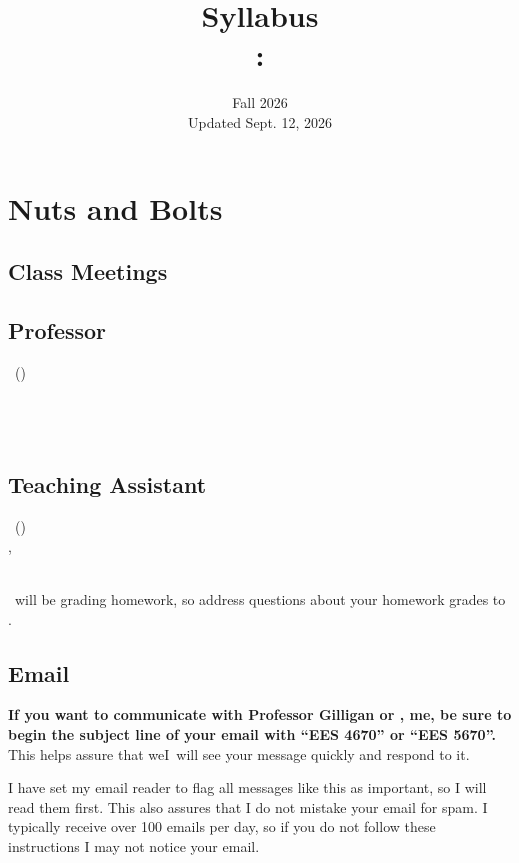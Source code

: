 \documentclass[11pt,twoside]{jgsyllabus}\usepackage[]{graphicx}\usepackage[]{xcolor}
\title{Syllabus\\
\ShortCourseNumber: \LongCourseName}
\date{Fall 2026\\ Updated Sept. 12, 2026}
\begin{document}
\maketitle

\section[Nuts \& Bolts]{Nuts and Bolts}
\label{sec:NutsAndBolts}
\subsection{Class Meetings}
\ClassMeetings
\subsection{Professor}
\label{sec:Professor}
\ProfName\ (\ProfPronouns)\\
\ProfDescr\\
\ProfOffice\\
\ProfEmail\\
\ProfOfficeHours
%
\ifTA
\subsection{Teaching Assistant}
\label{sec:TA}
\TaName\ (\TaPronouns)\\
\TaOfficeLoc\ifTaPhone , \TaPhone\fi\\
\TaEmail\\
\TaOfficeHours
\medskip

\noindent
\TaTitle\ will be grading homework, so address questions about your homework grades
to \TaAccusative.
\fi

\subsection{Email}
\textbf{%
If you want to communicate with
\ifTA
Professor Gilligan or \TaTitle,
\else
me,
\fi
be sure to begin the
subject line of your email with ``{\scshape EES 4670}'' or ``{\scshape EES 5670}''.
}%
This helps assure
that \ifTA we\else I\fi\ will see your message quickly and respond to it.

I have set my email reader to flag all messages like this as important, so I
will read them first. This also assures that I do not mistake your email for
spam. I typically receive over 100 emails per day, so if you do not follow these
instructions I may not notice your email.
\end{document}
